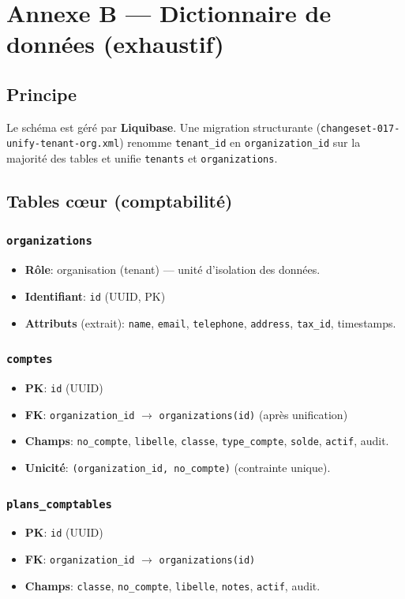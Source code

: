 \chapter{Annexe B --- Dictionnaire de données (exhaustif)}
\label{annexe:data}

\section{Principe}
Le schéma est géré par \textbf{Liquibase}. Une migration structurante (\texttt{changeset-017-unify-tenant-org.xml}) renomme \texttt{tenant\_id} en \texttt{organization\_id} sur la majorité des tables et unifie \texttt{tenants} et \texttt{organizations}.

\section{Tables cœur (comptabilité)}
\subsection{\texttt{organizations}}
\begin{itemize}
  \item \textbf{Rôle}: organisation (tenant) --- unité d'isolation des données.
  \item \textbf{Identifiant}: \texttt{id} (UUID, PK)
  \item \textbf{Attributs} (extrait): \texttt{name}, \texttt{email}, \texttt{telephone}, \texttt{address}, \texttt{tax\_id}, timestamps.
\end{itemize}

\subsection{\texttt{comptes}}
\begin{itemize}
  \item \textbf{PK}: \texttt{id} (UUID)
  \item \textbf{FK}: \texttt{organization\_id} \(\rightarrow\) \texttt{organizations(id)} (après unification)
  \item \textbf{Champs}: \texttt{no\_compte}, \texttt{libelle}, \texttt{classe}, \texttt{type\_compte}, \texttt{solde}, \texttt{actif}, audit.
  \item \textbf{Unicité}: \texttt{(organization\_id, no\_compte)} (contrainte unique).
\end{itemize}

\subsection{\texttt{plans\_comptables}}
\begin{itemize}
  \item \textbf{PK}: \texttt{id} (UUID)
  \item \textbf{FK}: \texttt{organization\_id} \(\rightarrow\) \texttt{organizations(id)}
  \item \textbf{Champs}: \texttt{classe}, \texttt{no\_compte}, \texttt{libelle}, \texttt{notes}, \texttt{actif}, audit.
\end{itemize}

